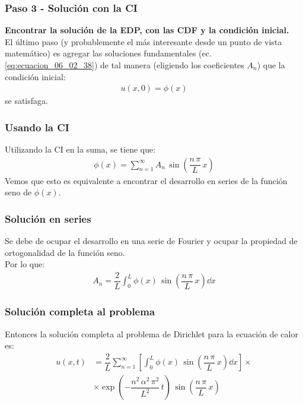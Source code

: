 \documentclass[12pt]{beamer}
\begin{document}
\begin{frame}
\frametitle{Paso 3 - Solución con la CI}
\textbf{Encontrar la solución de la EDP, con las CDF y la condición inicial.}
\\
\bigskip
\pause
El último paso (y probablemente el más interesante desde un punto de vista matemático) es agregar las soluciones fundamentales (ec. \ref{eq:ecuacion_06_02_38}) de tal manera (eligiendo los coeficientes $A_{n}$) que la condición inicial:
\pause
\begin{align*}
u(x, 0) = \phi (x)
\end{align*}
se satisfaga.
\end{frame}
\begin{frame}
\frametitle{Usando la CI}
Utilizando la CI en la suma, se tiene que:
\begin{align*}
\phi (x) = \sum_{n=1}^{\infty} A_{n} \, \sin \left( \dfrac{n \, \pi}{L} \, x \right)
\end{align*}
\pause
Vemos que esto es equivalente a encontrar el desarrollo en series de la función seno de $\phi (x)$.
\end{frame}
\begin{frame}
\frametitle{Solución en series}
Se debe de ocupar el desarrollo en una serie de Fourier y ocupar la propiedad de ortogonalidad de la función seno.
\\
\bigskip
\pause
Por lo que:
\begin{align}
A_{n} = \dfrac{2}{L} \int_{0}^{L} \phi (x) \, \sin \left( \dfrac{n \, \pi}{L} \, x \right) \dd{x}
\label{eq:ecuacion_06_02_40}    
\end{align}
\end{frame}
\begin{frame}
\frametitle{Solución completa al problema}
Entonces la solución completa al problema de Dirichlet para la ecuación de calor es:
\begin{align*}
u (x, t) &= \dfrac{2}{L} \sum_{n=1}^{\infty} \left[ \int_{0}^{L} \phi (x) \, \sin \left( \dfrac{n \, \pi}{L} \, x \right) \dd{x} \right] \times \\[1em]
&\times \exp \left( - \dfrac{n^{2} \, \alpha^{2} \, \pi^{2}}{L^{2}} \, t \right) \, \sin \left( \dfrac{n \, \pi}{L} \, x \right)
\end{align*}
\end{frame}
\end{document}
